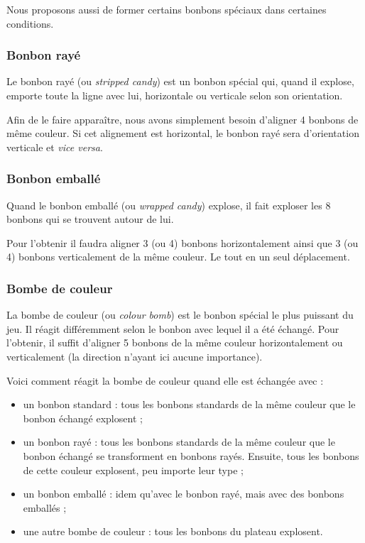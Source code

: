 \documentclass[11pt,a4paper]{article}
\begin{document}
Nous proposons aussi de former certains bonbons
spéciaux dans certaines conditions.

\subsubsection{Bonbon rayé}
Le bonbon rayé (ou \emph{stripped candy}) est un bonbon spécial qui, quand il
explose, emporte toute la ligne avec lui, horizontale ou
verticale selon son orientation.

Afin de le faire apparaître, nous avons simplement besoin
d'aligner 4 bonbons de même couleur.
Si cet alignement est horizontal, le bonbon rayé sera
d'orientation verticale et \emph{vice versa}.

\subsubsection{Bonbon emballé}
Quand le bonbon emballé (ou \emph{wrapped candy}) explose, il
fait exploser les 8 bonbons qui se trouvent autour de lui.

Pour l'obtenir il faudra aligner 3 (ou 4) bonbons
horizontalement ainsi que 3 (ou 4) bonbons
verticalement de la même couleur. Le tout en un seul
déplacement.

\subsubsection{Bombe de couleur}
La bombe de couleur (ou \emph{colour bomb}) est le bonbon spécial le plus puissant
du jeu. Il réagit différemment
selon le bonbon avec lequel il a été échangé. Pour
l'obtenir, il suffit d'aligner 5 bonbons de la même couleur
horizontalement ou verticalement (la direction n'ayant ici aucune importance).

Voici comment réagit la bombe de couleur quand elle est
échangée avec :

\begin{itemize}
	\item un bonbon standard : tous les bonbons standards de
        la même couleur que le bonbon échangé explosent ;
	\item un bonbon rayé : tous les bonbons standards de
        la même couleur que le bonbon échangé se transforment
        en bonbons rayés. Ensuite, tous les bonbons de cette
        couleur explosent, peu importe leur type ;
	\item un bonbon emballé : idem qu'avec le bonbon rayé, mais avec des bonbons emballés ;
	\item une autre bombe de couleur : tous les bonbons du plateau explosent.
\end{itemize}
\end{document}
